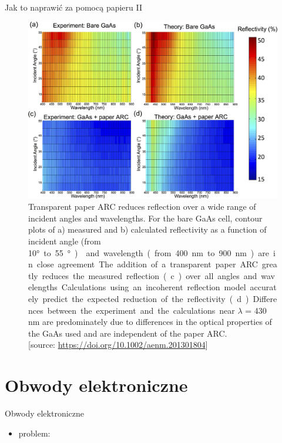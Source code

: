 \documentclass{beamer}
\begin{document}
\begin{frame}{Jak to naprawić za pomocą papieru II}

    \begin{figure}[h]
        \centering
         \includegraphics[width=0.65\linewidth]{fig3.png}
         \caption{
         Transparent paper ARC reduces reflection over a wide range of incident angles and wavelengths. For the bare GaAs cell, contour plots of a) measured and b) calculated reflectivity as a function of incident angle (from 10\si\degree to 55\si\degree) and wavelength (from 400 nm to 900 nm) are in close agreement. The addition of a transparent paper ARC greatly reduces the measured reflection (c) over all angles and wavelengths. Calculations using an incoherent reflection model accurately predict the expected reduction of the reflectivity (d). Differences between the experiment and the calculations near $\lambda$ = 430 nm are predominately due to differences in the optical properties of the GaAs used and are independent of the paper ARC.\\ 
	        [source: \url{https://doi.org/10.1002/aenm.201301804}]
         }
    \end{figure}
\end{frame}


\section{Obwody elektroniczne}

\begin{frame}{Obwody elektroniczne}

\begin{itemize}
\item problem:
\end{itemize}
    
\end{frame}
\end{document}
